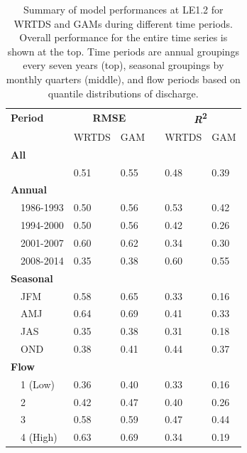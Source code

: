 \documentclass[letterpaper,12pt,oneside]{article}\usepackage[]{graphicx}\usepackage[]{color}
\begin{document}
\begin{table}[!tbp]
\caption{Summary of model performances at LE1.2 for \ac{WRTDS} and \acp{GAM} during different time periods.  Overall performance for the entire time series is shown at the top.  Time periods are annual groupings every seven years (top), seasonal groupings by monthly quarters (middle), and flow periods based on quantile distributions of discharge.\label{tab:perfLE12}} 
\begin{center}
\begin{tabular}{lllcll}
\hline\hline
\multicolumn{1}{l}{\bfseries Period}&\multicolumn{2}{c}{\bfseries RMSE}&\multicolumn{1}{c}{\bfseries }&\multicolumn{2}{c}{\bfseries {\bf \textit{R}\textsuperscript{2}}}\tabularnewline
\cline{2-3} \cline{5-6}
\multicolumn{1}{l}{}&\multicolumn{1}{c}{WRTDS}&\multicolumn{1}{c}{GAM}&\multicolumn{1}{c}{}&\multicolumn{1}{c}{WRTDS}&\multicolumn{1}{c}{GAM}\tabularnewline
\hline
{\bfseries All}&&&&&\tabularnewline
~~&0.51&0.55&&0.48&0.39\tabularnewline
\hline
{\bfseries Annual}&&&&&\tabularnewline
~~1986-1993&0.50&0.56&&0.53&0.42\tabularnewline
~~1994-2000&0.50&0.56&&0.42&0.26\tabularnewline
~~2001-2007&0.60&0.62&&0.34&0.30\tabularnewline
~~2008-2014&0.35&0.38&&0.60&0.55\tabularnewline
\hline
{\bfseries Seasonal}&&&&&\tabularnewline
~~JFM&0.58&0.65&&0.33&0.16\tabularnewline
~~AMJ&0.64&0.69&&0.41&0.33\tabularnewline
~~JAS&0.35&0.38&&0.31&0.18\tabularnewline
~~OND&0.38&0.41&&0.44&0.37\tabularnewline
\hline
{\bfseries Flow}&&&&&\tabularnewline
~~1 (Low)&0.36&0.40&&0.33&0.16\tabularnewline
~~2&0.42&0.47&&0.40&0.26\tabularnewline
~~3&0.58&0.59&&0.47&0.44\tabularnewline
~~4 (High)&0.63&0.69&&0.34&0.19\tabularnewline
\hline
\end{tabular}\end{center}

\end{table}
\end{document}
